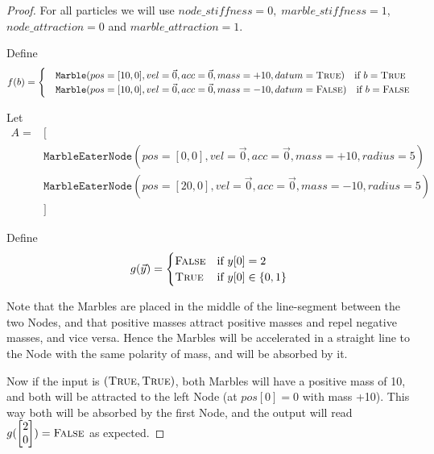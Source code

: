 \begin{proof}

    For all particles we will use $node\_stiffness = 0,\; marble\_stiffness =1$, $node\_attraction=0$ and $marble\_attraction=1$.

    Define 
    \begin{equation}
        f(b) = \begin{cases}
            &\texttt{Marble}(pos=[10, 0], vel=\vec{0}, acc=\vec{0}, mass=+10, datum=\textsc{True}) \quad \text{if $b = \textsc{True}$} \\
            &\texttt{Marble}(pos=[10, 0], vel=\vec{0}, acc=\vec{0}, mass=-10, datum=\textsc{False}) \quad \text{if $b = \textsc{False}$}
        \end{cases}
    \end{equation}
    
    Let
    \begin{align}
        A = &[ \nonumber \\
        & \texttt{MarbleEaterNode}(pos=[0, 0], vel=\vec{0}, acc=\vec{0}, mass=+10, radius=5) \nonumber \\
        & \texttt{MarbleEaterNode}(pos=[20, 0], vel=\vec{0}, acc=\vec{0}, mass=-10, radius=5) \nonumber \\
        &]
    \end{align}

    Define 
    \begin{equation}
        g(\vec{y}) = \begin{cases}
                    \textsc{False} &\text{if } y[0] = 2 \\
                    \textsc{True} &\text{if } y[0] \in \{0, 1\}
        \end{cases}
    \end{equation}
    
    Note that the Marbles are placed in the middle of the line-segment between the two Nodes, and that positive masses attract positive masses and repel negative masses, and vice versa. Hence the Marbles will be accelerated in a straight line to the Node with the same polarity of mass, and will be absorbed by it.
    
    Now if the input is $(\textsc{True}, \textsc{True})$, both Marbles will have a positive mass of 10, and both will be attracted to the left Node (at $pos[0] = 0$ with mass +10). This way both will be absorbed by the first Node, and the output will read $g(\begin{bmatrix}2\\0\end{bmatrix}) = \textsc{False}$ as expected.
    

\end{proof}
